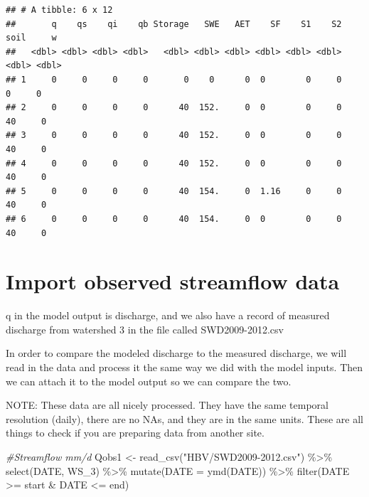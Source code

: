 \documentclass[
]{book}
\newenvironment{Shaded}{\begin{snugshade}}{\end{snugshade}}
\newcommand{\AttributeTok}[1]{\textcolor[rgb]{0.77,0.63,0.00}{#1}}
\newcommand{\CommentTok}[1]{\textcolor[rgb]{0.56,0.35,0.01}{\textit{#1}}}
\newcommand{\FunctionTok}[1]{\textcolor[rgb]{0.00,0.00,0.00}{#1}}
\newcommand{\NormalTok}[1]{#1}
\newcommand{\OtherTok}[1]{\textcolor[rgb]{0.56,0.35,0.01}{#1}}
\newcommand{\SpecialCharTok}[1]{\textcolor[rgb]{0.00,0.00,0.00}{#1}}
\newcommand{\StringTok}[1]{\textcolor[rgb]{0.31,0.60,0.02}{#1}}
\begin{document}
\begin{verbatim}
## # A tibble: 6 x 12
##       q    qs    qi    qb Storage   SWE   AET    SF    S1    S2  soil     w
##   <dbl> <dbl> <dbl> <dbl>   <dbl> <dbl> <dbl> <dbl> <dbl> <dbl> <dbl> <dbl>
## 1     0     0     0     0       0    0      0  0        0     0     0     0
## 2     0     0     0     0      40  152.     0  0        0     0    40     0
## 3     0     0     0     0      40  152.     0  0        0     0    40     0
## 4     0     0     0     0      40  152.     0  0        0     0    40     0
## 5     0     0     0     0      40  154.     0  1.16     0     0    40     0
## 6     0     0     0     0      40  154.     0  0        0     0    40     0
\end{verbatim}

\hypertarget{import-observed-streamflow-data}{%
\section{Import observed streamflow data}\label{import-observed-streamflow-data}}

q in the model output is discharge, and we also have a record of measured discharge from watershed 3 in the file called SWD2009-2012.csv

In order to compare the modeled discharge to the measured discharge, we will read in the data and process it the same way we did with the model inputs. Then we can attach it to the model output so we can compare the two.

NOTE: These data are all nicely processed. They have the same temporal resolution (daily), there are no NAs, and they are in the same units. These are all things to check if you are preparing data from another site.

\begin{Shaded}
\begin{Highlighting}[]
\CommentTok{\#Streamflow mm/d}
\NormalTok{Qobs1 }\OtherTok{\textless{}{-}} \FunctionTok{read\_csv}\NormalTok{(}\StringTok{"HBV/SWD2009{-}2012.csv"}\NormalTok{) }\SpecialCharTok{\%\textgreater{}\%}
         \FunctionTok{select}\NormalTok{(DATE, WS\_3) }\SpecialCharTok{\%\textgreater{}\%}
         \FunctionTok{mutate}\NormalTok{(}\AttributeTok{DATE =} \FunctionTok{ymd}\NormalTok{(DATE)) }\SpecialCharTok{\%\textgreater{}\%}
         \FunctionTok{filter}\NormalTok{(DATE }\SpecialCharTok{\textgreater{}=}\NormalTok{ start }\SpecialCharTok{\&}\NormalTok{ DATE }\SpecialCharTok{\textless{}=}\NormalTok{ end)}
\end{Highlighting}
\end{Shaded}
\end{document}
